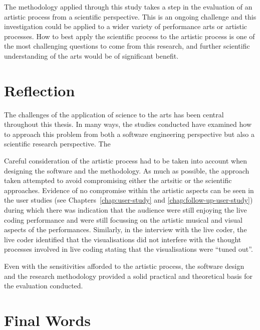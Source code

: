 The methodology applied through this study takes a step in the evaluation of an artistic process from a scientific perspective. This is an ongoing challenge and this investigation could be applied to a wider variety of performance arts or artistic processes. How to best apply the scientific process to the artistic process is one of the most challenging questions to come from this research, and further scientific understanding of the arts would be of significant benefit.

\section{Reflection}

The challenges of the application of science to the arts has been central throughout this thesis. In many ways, the studies conducted have examined how to approach this problem from both a software engineering perspective but also a scientific research perspective. The 

Careful consideration of the artistic process had to be taken into account when designing the software and the methodology. As much as possible, the approach taken attempted to avoid compromising either the artsitic or the scientific approaches. Evidence of no compromise within the artistic aspects can be seen in the user studies (see Chapters~\ref{chap:user-study} and \ref{chap:follow-up-user-study}) during which there  was indication that the audience were still enjoying the live coding performance and were still focussing on the artistic musical and visual aspects of the performances. Similarly, in the interview with the live coder, the live coder identified that the visualisations did not interfere with the thought processes involved in live coding stating that the visualisations were ``tuned out''.

Even with the sensitivities afforded to the artistic process, the software design and the research methodology provided a solid practical and theoretical basis for the evaluation conducted. \more



\section{Final Words}

